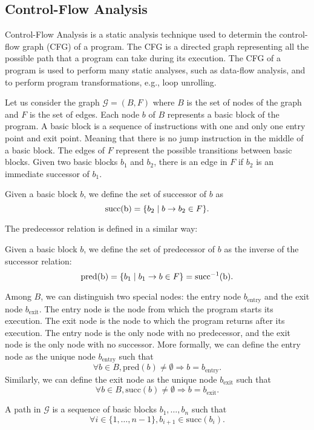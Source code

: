 
\subsection{Control-Flow Analysis}
\label{sec:controlflow}
Control-Flow Analysis is a static analysis technique used to determin the control-flow graph (CFG) of a program.
The CFG is a directed graph representing all the possible path that a program can
take during its execution. The CFG of a program is used to perform many static analyses, such as
data-flow analysis, and to perform program transformations, e.g., loop unrolling.


Let us consider the graph $\mathcal{G}=(B,F)$ where $B$ is the set of nodes 
of the graph and $F$ is the set of edges. Each node $b$ of $B$ represents a
basic block of the program. A basic block is a sequence of instructions with one and only one
entry point and exit point. Meaning that there is no jump instruction in the middle of a basic block.
The edges of $F$ represent the possible transitions between basic blocks. Given two
basic blocks $b_1$ and $b_2$, there is an edge  in $F$ if $b_2$ is an immediate
successor of $b_1$.
\begin{definition}
    Given a basic block $b$, we define the set of successor of $b$ as 
    $$ \text{succ(b)} = \{b_2 \mid  b \rightarrow b_2  \in F\}.$$
\end{definition}
The predecessor relation is defined in a similar way:
\begin{definition}
    Given a basic block $b$, we define the set of predecessor of $b$ as the 
    inverse of the successor relation:
    $$ \text{pred(b)} = \{b_1 \mid  b_1 \rightarrow b  \in F\} = \text{succ}^{-1}\text{(b)}.$$
\end{definition}
Among $B$, we can distinguish two special nodes: the entry node $b_{\text{entry}}$ and 
the exit node $b_{\text{exit}}$. The entry node is the node from which the program starts its execution.
The exit node is the node to which the program returns after its execution. The entry node is the only node
with no predecessor, and the exit node is the only node with no successor. More 
formally, we can define the entry node as the unique node $b_{\text{entry}}$ such that
$$ \forall b \in B, \text{pred}(b) \neq \emptyset \Rightarrow b = b_{\text{entry}}.$$
Similarly, we can define the exit node as the unique node $b_{\text{exit}}$ such that
$$ \forall b \in B, \text{succ}(b) \neq \emptyset \Rightarrow b = b_{\text{exit}}.$$
\begin{definition}
    A path in $\mathcal{G}$ is a sequence of basic blocks $b_1, \ldots, b_n$ such that
    $$ \forall i \in \{1, \ldots, n-1\},  b_{i+1} \in \text{succ}(b_i).$$
\end{definition}


